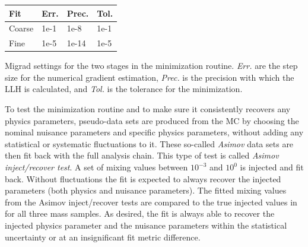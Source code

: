 \begin{margintable}
    \small
        \begin{tabular}{ llll }
        \hline\hline
        \textbf{Fit} & \textbf{Err.} & \textbf{Prec.} & \textbf{Tol.} \\
        \hline\hline
        Coarse & 1e-1 & 1e-8 & 1e-1 \\
        Fine & 1e-5 & 1e-14 & 1e-5 \\
        \hline
        \end{tabular}
    \caption[Staged minimization routine settings]{Migrad settings for the two stages in the minimization routine. \textit{Err.} are the step size for the numerical gradient estimation, \textit{Prec.} is the precision with which the LLH is calculated, and \textit{Tol.} is the tolerance for the minimization.}
\end{margintable}

To test the minimization routine and to make sure it consistently recovers any physics parameters, pseudo-data sets are produced from the MC by choosing the nominal nuisance parameters and specific physics parameters, without adding any statistical or systematic fluctuations to it. These so-called \textit{Asimov} data sets are then fit back with the full analysis chain. This type of test is called \textit{Asimov inject/recover test}. A set of mixing values between $10^{-3}$ and $10^{0}$ is injected and fit back.
Without fluctuations the fit is expected to always recover the injected parameters (both physics and nuisance parameters). The fitted mixing values from the Asimov inject/recover tests are compared to the true injected values in  for all three mass samples. As desired, the fit is always able to recover the injected physics parameter and the nuisance parameters within the statistical uncertainty or at an insignificant fit metric difference. 

